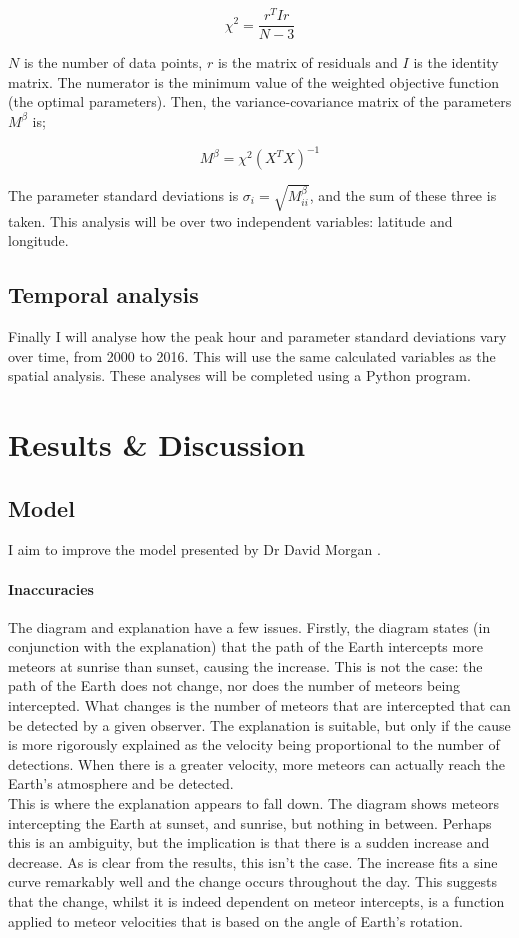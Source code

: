 \begin{equation}
\chi^2 = \frac{r^T I r}{N - 3}
\end{equation}

$N$ is the number of data points, $r$ is the matrix of 
residuals and $I$ is the identity matrix. The numerator is 
the minimum value of the weighted objective function (the 
optimal parameters). Then, the variance-covariance matrix 
of the parameters $M^{\beta}$ is;

\begin{equation} 
M^{\beta} = \chi^2 \left( X^T X \right)^{-1}
\end{equation}

The parameter standard deviations is $\sigma_i 
=\sqrt{M_{ii}^{\beta}}$, and the sum of these three is taken. 
This analysis will be over two independent variables: latitude and longitude. 
\subsection{Temporal analysis}
Finally I will analyse how the peak hour and parameter standard deviations vary over time, from 2000 to 2016. This will use the same calculated variables as the spatial analysis. These analyses will be completed using a Python program.

\section{Results \& Discussion}
\subsection{Model}
I aim to improve the model presented by Dr David Morgan \cite{baa}.
\paragraph{Inaccuracies\\}
The diagram and explanation have a few issues. Firstly, the diagram states (in conjunction with the explanation) that the path of the Earth intercepts more meteors at sunrise than sunset, causing the increase. This is not the case: the path of the Earth does not change, nor does the number of meteors being intercepted. What changes is the number of meteors that are intercepted that can be detected by a given observer. The explanation is suitable, but only if the cause is more rigorously explained as the velocity being proportional to the number of detections. When there is a greater velocity, more meteors can actually reach the Earth's atmosphere and be detected. \\
This is where the explanation appears to fall down. The diagram shows meteors intercepting the Earth at sunset, and sunrise, but nothing in between. Perhaps this is an ambiguity, but the implication is that there is a sudden increase and decrease. As is clear from the results, this isn't the case. The increase fits a sine curve remarkably well and the change occurs throughout the day. This suggests that the change, whilst it is indeed dependent on meteor intercepts, is a function applied to meteor velocities that is based on the angle of Earth's rotation. \\

